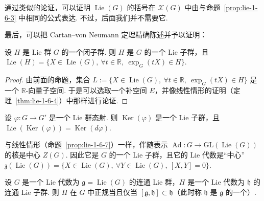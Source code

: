 \begin{remark*}
通过类似的论证，可以证明 $\operatorname{Lie}(G)$ 的括号在 $\mathscr X(G)$ 中由与命题~\ref{prop:lie-1-6-3} 中相同的公式表达. 不过，后面我们并不需要它.
\end{remark*}

最后，可以把 Cartan--von Neumann 定理精确陈述并予以证明：

\begin{theorem}\label{thm:lie-1-7-10}
设 $H$ 是 Lie 群 $G$ 的一个闭子群. 则 $H$ 是 $G$ 的一个 Lie 子群，且 $\operatorname{Lie}(H)=\{X\in\operatorname{Lie}(G),\ \forall t\in\mathbb R,\ \exp_{G}(tX)\in H\}$.
\end{theorem}

\begin{proof}
由前面的命题，集合 $L:=\{X\in\operatorname{Lie}(G),\ \forall t\in\mathbb R,\ \exp_{G}(tX)\in H\}$ 是一个 $\mathbb R$-向量子空间. 于是可以选取一个补空间 $E$，并像线性情形的证明（定理~\ref{thm:lie-1-6-4}）中那样进行论证.
\end{proof}

\begin{corollary}\label{cor:lie-1-7-11}
设 $\varphi:G\longrightarrow G'$ 是一个 Lie 群态射. 则 $\operatorname{Ker}(\varphi)$ 是一个 Lie 子群，且 $\operatorname{Lie}(\operatorname{Ker}(\varphi))=\operatorname{Ker}(d\varphi)$.
\end{corollary}

\begin{example*}
与线性情形（命题~\ref{prop:lie-1-6-7}）一样，伴随表示 $\operatorname{Ad}:G\longrightarrow\mathrm{GL}(\operatorname{Lie}(G))$ 的核是中心 $Z(G)$. 因此它是 $G$ 的一个 Lie 子群，且它的 Lie 代数是``中心''$\mathfrak{z}(\operatorname{Lie}(G))=\{X\in\operatorname{Lie}(G),\ \forall Y\in\operatorname{Lie}(G),\ [X,Y]=0\}$.
\end{example*}

\begin{corollary}\label{cor:lie-1-7-12}
设 $G$ 是一个 Lie 代数为 $\mathfrak g=\operatorname{Lie}(G)$ 的连通 Lie 群，$H$ 是一个 Lie 代数为 $\mathfrak h$ 的连通 Lie 子群. 则 $H$ 在 $G$ 中正规当且仅当 $[\mathfrak g,\mathfrak h]\subset\mathfrak h$（此时称 $\mathfrak h$ 是 $\mathfrak g$ 的一个）.
\end{corollary}

